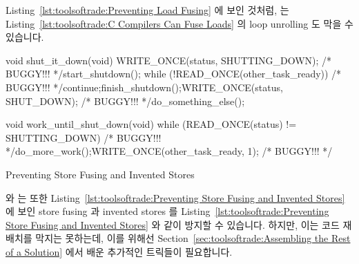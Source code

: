 {{{{Listing~\ref{lst:toolsoftrade:Preventing Load Fusing} 에 보인 것처럼,
 는
Listing~\ref{lst:toolsoftrade:C Compilers Can Fuse Loads} 의 loop unrolling 도
막을 수 있습니다.

\begin{listing}[tbp]
\begin{linelabel}
\begin{VerbatimL}[commandchars=\\\[\]]
void shut_it_down(void)
{
	WRITE_ONCE(status, SHUTTING_DOWN); /* BUGGY!!! */\lnlbl[store:a]
	start_shutdown();
	while (!READ_ONCE(other_task_ready)) /* BUGGY!!! */\lnlbl[loop:b]
		continue;\lnlbl[loop:e]
	finish_shutdown();\lnlbl[finish]
	WRITE_ONCE(status, SHUT_DOWN); /* BUGGY!!! */\lnlbl[store:b]
	do_something_else();
}

void work_until_shut_down(void)
{
	while (READ_ONCE(status) != SHUTTING_DOWN) /* BUGGY!!! */
		do_more_work();
	WRITE_ONCE(other_task_ready, 1); /* BUGGY!!! */
}
\end{VerbatimL}
\end{linelabel}
\caption{Preventing Store Fusing and Invented Stores}
\label{lst:toolsoftrade:Preventing Store Fusing and Invented Stores}
\end{listing}

 와  는 또한
Listing~\ref{lst:toolsoftrade:Preventing Store Fusing and Invented Stores}
에 보인 store fusing 과 invented stores 를
Listing~\ref{lst:toolsoftrade:Preventing Store Fusing and Invented Stores}
와 같이 방지할 수 있습니다.
하지만, 이는 코드 재배치를 막지는 못하는데, 이를 위해선
Section~\ref{sec:toolsoftrade:Assembling the Rest of a Solution}
에서 배운 추가적인 트릭들이 필요합니다.

}}}}
